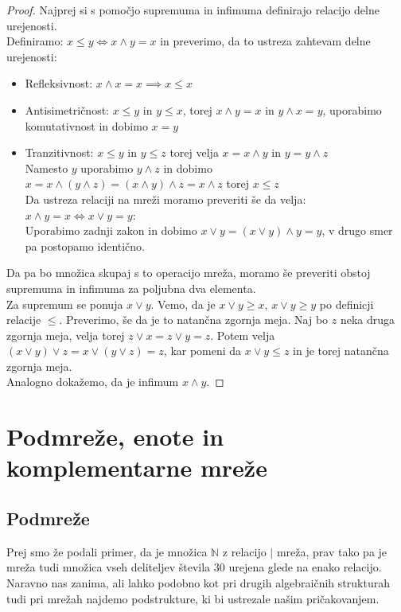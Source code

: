 \documentclass[a4paper]{article}
\begin{document}
\begin{proof}
Najprej si s pomočjo supremuma in infimuma definirajo relacijo delne urejenosti.\\
Definiramo: $x \leq y \iff x \land y = x$ in preverimo, da to ustreza zahtevam delne urejenosti:
\begin{itemize}
\item Refleksivnost: $x \land x = x \implies x \leq x$
\item Antisimetričnost: $x \leq y$ in $y \leq x$, torej $x \land y = x$ in $y \land x = y$, uporabimo komutativnost in dobimo $x = y$
\item Tranzitivnost: $x \leq y$ in $y \leq z$ torej velja $x = x \land y$ in $y = y \land z$ \\ Namesto $y$ uporabimo $y \land z$ in dobimo $x = x \land (y \land z) = (x \land y) \land z = x \land z$ torej  $x \leq z$\\
Da ustreza relaciji na mreži moramo preveriti še da velja: $x \land y = x \iff x \lor y = y$:\\ 
Uporabimo zadnji zakon in dobimo $x \lor y = (x \lor y) \land y = y$, v drugo smer pa postopamo identično.
\end{itemize}

Da pa bo množica skupaj s to operacijo mreža, moramo še preveriti obstoj supremuma in infimuma za poljubna dva elementa. \\
Za supremum se ponuja $x \lor y$. Vemo, da je $x \lor y \geq x$, $x \lor y \geq y$ po definicji relacije $\leq$. Preverimo, še da je to natančna zgornja meja. Naj bo $z$ neka druga zgornja meja, velja torej $z \lor x = z \lor y = z$. Potem velja $(x \lor y) \lor z = x \lor (y \lor z) = z$, kar pomeni da $x \lor y \leq z$ in je torej natančna zgornja meja.\\
Analogno dokažemo, da je infimum $x \land y$. 

\end{proof}

\section{Podmreže, enote in komplementarne mreže}
\label{sec:podmreze_enote_komplementarne}

\subsection{Podmreže}

Prej smo že podali primer, da je množica $\mathbb{N}$ z relacijo $\mid$ mreža, prav tako pa je mreža tudi množica vseh deliteljev števila $30$ urejena glede na enako relacijo. Naravno nas zanima, ali lahko podobno kot pri drugih algebraičnih strukturah tudi pri mrežah najdemo podstrukture, ki bi ustrezale našim pričakovanjem.
\end{document}
